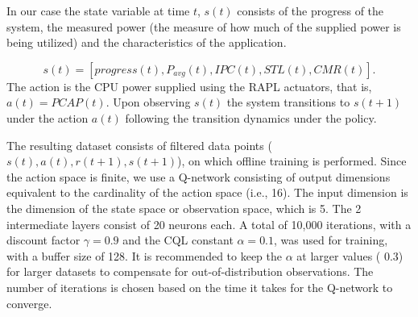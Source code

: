 In our case the state variable at time  $t$, $s(t)$ consists of the progress of the system, the measured power (the measure of how much of the supplied power is being utilized) and the characteristics of the application. 

\begin{equation*}
s(t) = [progress(t), P_{avg}(t), IPC(t), STL(t), CMR(t)].
\end{equation*}
The action is the CPU power supplied using the RAPL actuators, that is, $a(t) = PCAP(t)$. Upon observing $s(t)$ the system transitions to $s(t+1)$ under the action $a(t)$ following the transition dynamics under the policy.

The resulting dataset consists of filtered data points ($s(t), a(t), r(t+1), s(t+1)$),  on which offline training is performed. Since the action space is finite, we use a Q-network consisting of output dimensions equivalent to the cardinality of the action space (i.e., 16). The input dimension is the dimension of the state space or observation space, which is 5. The 2 intermediate layers consist of 20 neurons each. A total of 10,000 iterations, with a discount factor $\gamma = 0.9$ and the CQL constant $\alpha = 0.1$, was used for training, with a buffer size of 128. It is recommended to keep the $\alpha$ at larger values ( 0.3) for larger datasets to compensate for out-of-distribution observations. The number of iterations is chosen based on the time it takes for the Q-network to converge.

